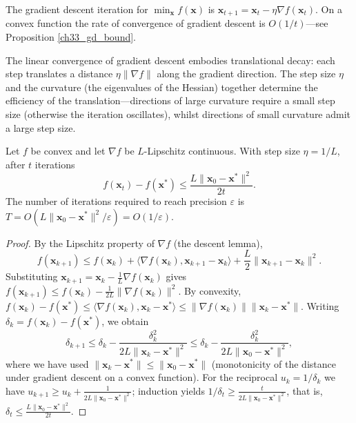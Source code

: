\begin{definition}\label{def:gd_convergence_cycle}
The gradient descent iteration for $\min_{\mathbf{x}} f(\mathbf{x})$ is $\mathbf{x}_{t+1} = \mathbf{x}_t - \eta \nabla f(\mathbf{x}_t)$. On a convex function the rate of convergence of gradient descent is $O(1/t)$---see Proposition \cref{ch33_gd_bound}.

The linear convergence of gradient descent embodies translational decay: each step translates a distance $\eta \|\nabla f\|$ along the gradient direction. The step size $\eta$ and the curvature (the eigenvalues of the Hessian) together determine the efficiency of the translation---directions of large curvature require a small step size (otherwise the iteration oscillates), whilst directions of small curvature admit a large step size.
\end{definition}

\begin{proposition}\label{ch33_gd_bound}
Let $f$ be convex and let $\nabla f$ be $L$-Lipschitz continuous. With step size $\eta = 1/L$, after $t$ iterations
\[
f(\mathbf{x}_t) - f(\mathbf{x}^*) \le \frac{L \|\mathbf{x}_0 - \mathbf{x}^*\|^2}{2t}.
\]
The number of iterations required to reach precision $\varepsilon$ is $T = O(L\|\mathbf{x}_0-\mathbf{x}^*\|^2/\varepsilon) = O(1/\varepsilon)$.
\end{proposition}

\begin{proof}
By the Lipschitz property of $\nabla f$ (the descent lemma),
\[
f(\mathbf{x}_{k+1}) \le f(\mathbf{x}_k) + \langle \nabla f(\mathbf{x}_k), \mathbf{x}_{k+1}-\mathbf{x}_k\rangle + \frac{L}{2}\|\mathbf{x}_{k+1}-\mathbf{x}_k\|^2.
\]
Substituting $\mathbf{x}_{k+1} = \mathbf{x}_k - \frac{1}{L}\nabla f(\mathbf{x}_k)$ gives $f(\mathbf{x}_{k+1}) \le f(\mathbf{x}_k) - \frac{1}{2L}\|\nabla f(\mathbf{x}_k)\|^2$. By convexity, $f(\mathbf{x}_k) - f(\mathbf{x}^*) \le \langle \nabla f(\mathbf{x}_k), \mathbf{x}_k - \mathbf{x}^*\rangle \le \|\nabla f(\mathbf{x}_k)\|\|\mathbf{x}_k - \mathbf{x}^*\|$. Writing $\delta_k = f(\mathbf{x}_k) - f(\mathbf{x}^*)$, we obtain
\[
\delta_{k+1} \le \delta_k - \frac{\delta_k^2}{2L\|\mathbf{x}_k - \mathbf{x}^*\|^2} \le \delta_k - \frac{\delta_k^2}{2L\|\mathbf{x}_0 - \mathbf{x}^*\|^2},
\]
where we have used $\|\mathbf{x}_k - \mathbf{x}^*\| \le \|\mathbf{x}_0 - \mathbf{x}^*\|$ (monotonicity of the distance under gradient descent on a convex function). For the reciprocal $u_k = 1/\delta_k$ we have $u_{k+1} \ge u_k + \frac{1}{2L\|\mathbf{x}_0-\mathbf{x}^*\|^2}$; induction yields $1/\delta_t \ge \frac{t}{2L\|\mathbf{x}_0-\mathbf{x}^*\|^2}$, that is, $\delta_t \le \frac{L\|\mathbf{x}_0-\mathbf{x}^*\|^2}{2t}$.
\end{proof}

